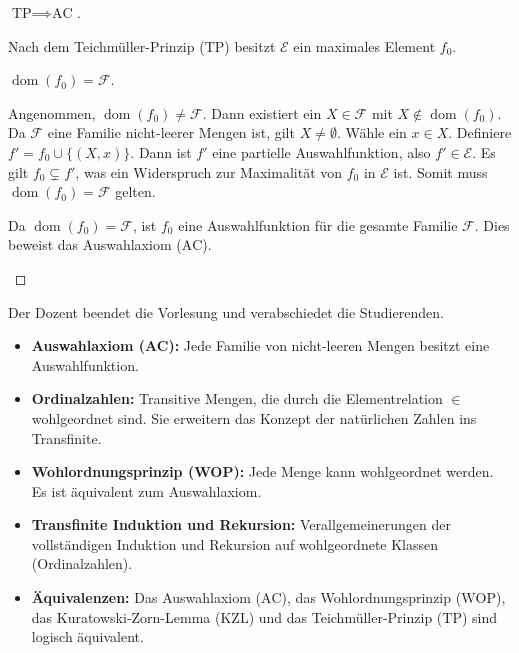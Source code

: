 \begin{proof}[$\text{TP} \implies \text{AC}$]
\begin{math-stroke}
Nach dem Teichmüller-Prinzip ($\text{TP}$) besitzt $\mathcal{E}$ ein maximales Element $f_0$.

\begin{claim}
$\operatorname{dom}(f_0) = \mathcal{F}$.
\end{claim}
\begin{short-proof}
Angenommen, $\operatorname{dom}(f_0) \neq \mathcal{F}$. Dann existiert ein $X \in \mathcal{F}$ mit $X \notin \operatorname{dom}(f_0)$.
Da $\mathcal{F}$ eine Familie nicht-leerer Mengen ist, gilt $X \neq \emptyset$.
Wähle ein $x \in X$.
Definiere $f' = f_0 \cup \{(X, x)\}$.
Dann ist $f'$ eine partielle Auswahlfunktion, also $f' \in \mathcal{E}$.
Es gilt $f_0 \subsetneq f'$, was ein Widerspruch zur Maximalität von $f_0$ in $\mathcal{E}$ ist.
Somit muss $\operatorname{dom}(f_0) = \mathcal{F}$ gelten.
\end{short-proof}

Da $\operatorname{dom}(f_0) = \mathcal{F}$, ist $f_0$ eine Auswahlfunktion für die gesamte Familie $\mathcal{F}$.
Dies beweist das Auswahlaxiom ($\text{AC}$).
\end{math-stroke}
\end{proof}

\begin{meta-note}
Der Dozent beendet die Vorlesung und verabschiedet die Studierenden.
\end{meta-note}

\begin{spoken-clean}[01:10:00 - 01:29:21]
\end{spoken-clean}

\begin{nice-box}
\begin{itemize}
    \item \textbf{Auswahlaxiom (AC):} Jede Familie von nicht-leeren Mengen besitzt eine Auswahlfunktion.
    \item \textbf{Ordinalzahlen:} Transitive Mengen, die durch die Elementrelation $\in$ wohlgeordnet sind. Sie erweitern das Konzept der natürlichen Zahlen ins Transfinite.
    \item \textbf{Wohlordnungsprinzip (WOP):} Jede Menge kann wohlgeordnet werden. Es ist äquivalent zum Auswahlaxiom.
    \item \textbf{Transfinite Induktion und Rekursion:} Verallgemeinerungen der vollständigen Induktion und Rekursion auf wohlgeordnete Klassen (Ordinalzahlen).
    \item \textbf{Äquivalenzen:} Das Auswahlaxiom ($\text{AC}$), das Wohlordnungsprinzip ($\text{WOP}$), das Kuratowski-Zorn-Lemma ($\text{KZL}$) und das Teichmüller-Prinzip ($\text{TP}$) sind logisch äquivalent.
\end{itemize}
\end{nice-box}